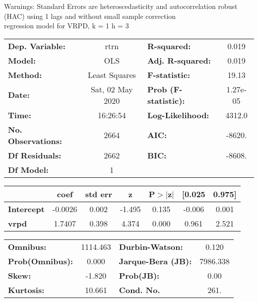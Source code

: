 Warnings: \newline
 [1] Standard Errors are heteroscedasticity and autocorrelation robust (HAC) using 1 lags and without small sample correction\\ 

regression model for VRPD, k = 1 h = 3\begin{center}
\begin{tabular}{lclc}
\toprule
\textbf{Dep. Variable:}    &       rtrn       & \textbf{  R-squared:         } &     0.019   \\
\textbf{Model:}            &       OLS        & \textbf{  Adj. R-squared:    } &     0.019   \\
\textbf{Method:}           &  Least Squares   & \textbf{  F-statistic:       } &     19.13   \\
\textbf{Date:}             & Sat, 02 May 2020 & \textbf{  Prob (F-statistic):} &  1.27e-05   \\
\textbf{Time:}             &     16:26:54     & \textbf{  Log-Likelihood:    } &    4312.0   \\
\textbf{No. Observations:} &        2664      & \textbf{  AIC:               } &    -8620.   \\
\textbf{Df Residuals:}     &        2662      & \textbf{  BIC:               } &    -8608.   \\
\textbf{Df Model:}         &           1      & \textbf{                     } &             \\
\bottomrule
\end{tabular}
\begin{tabular}{lcccccc}
                   & \textbf{coef} & \textbf{std err} & \textbf{z} & \textbf{P$> |$z$|$} & \textbf{[0.025} & \textbf{0.975]}  \\
\midrule
\textbf{Intercept} &      -0.0026  &        0.002     &    -1.495  &         0.135        &       -0.006    &        0.001     \\
\textbf{vrpd}      &       1.7407  &        0.398     &     4.374  &         0.000        &        0.961    &        2.521     \\
\bottomrule
\end{tabular}
\begin{tabular}{lclc}
\textbf{Omnibus:}       & 1114.463 & \textbf{  Durbin-Watson:     } &    0.120  \\
\textbf{Prob(Omnibus):} &   0.000  & \textbf{  Jarque-Bera (JB):  } & 7986.338  \\
\textbf{Skew:}          &  -1.820  & \textbf{  Prob(JB):          } &     0.00  \\
\textbf{Kurtosis:}      &  10.661  & \textbf{  Cond. No.          } &     261.  \\
\bottomrule
\end{tabular}
\end{center}

